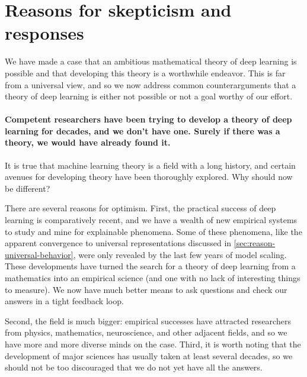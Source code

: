 \section{Reasons for skepticism and responses}
\label{sec:reasons_for_skepticism}

We have made a case that an ambitious mathematical theory of deep learning is possible and that developing this theory is a worthwhile endeavor.
This is far from a universal view, and so we now address common counterarguments that a theory of deep learning is either not possible or not a goal worthy of our effort.

\paragraph{Competent researchers have been trying to develop a theory of deep learning for decades, and we don't have one.
Surely if there was a theory, we would have already found it.}
It is true that machine learning theory is a field with a long history, and certain avenues for developing theory have been thoroughly explored.
Why should now be different?

There are several reasons for optimism.
First, the practical success of deep learning is comparatively recent, and we have a wealth of new empirical systems to study and mine for explainable phenomena.
Some of these phenomena, like the apparent convergence to universal representations discussed in \cref{sec:reason-universal-behavior}, were only revealed by the last few years of model scaling.
These developments have turned the search for a theory of deep learning from a mathematics into an empirical science (and one with no lack of interesting things to measure).
We now have much better means to ask questions and check our answers in a tight feedback loop.

Second, the field is much bigger: empirical successes have attracted researchers from physics, mathematics, neuroscience, and other adjacent fields, and so we have more and more diverse minds on the case. Third, it is worth noting that the development of major sciences has usually taken at least several decades, so we should not be too discouraged that we do not yet have all the answers.


